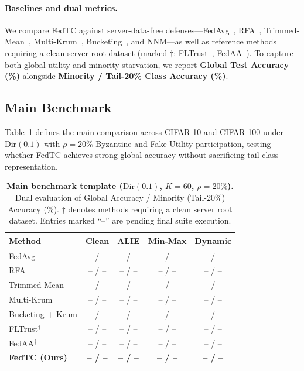 \paragraph{Baselines and dual metrics.}
We compare FedTC against server-data-free defenses---FedAvg~\cite{mcmahan2017communication}, RFA~\cite{pillutla2022robust}, Trimmed-Mean~\cite{yin2018byzantine}, Multi-Krum~\cite{blanchard2017machine}, Bucketing~\cite{karimireddy2021learning}, and NNM---as well as reference methods requiring a clean server root dataset (marked $\dagger$: FLTrust~\cite{cao2020fltrust}, FedAA~\cite{he2025fedaa}). To capture both global utility and minority starvation, we report \textbf{Global Test Accuracy (\%)} alongside \textbf{Minority / Tail-20\% Class Accuracy (\%)}.

\subsection{Main Benchmark}
\label{sec:main_benchmark}

Table~\ref{tab:main_benchmark} defines the main comparison across CIFAR-10 and CIFAR-100 under $\mathrm{Dir}(0.1)$ with $\rho = 20\%$ Byzantine and Fake Utility participation, testing whether FedTC achieves strong global accuracy without sacrificing tail-class representation.

\begin{table}[t]
  \centering
  \caption{\textbf{Main benchmark template ($\mathrm{Dir}(0.1)$, $K=60$, $\rho=20\%$).} Dual evaluation of Global Accuracy / Minority (Tail-20\%) Accuracy (\%). $\dagger$ denotes methods requiring a clean server root dataset. Entries marked ``--'' are pending final suite execution.}
  \label{tab:main_benchmark}
  \setlength{\tabcolsep}{3.5pt}
  \small
  \begin{tabular}{lcccc}
    \toprule
    \textbf{Method} & \textbf{Clean} & \textbf{ALIE} & \textbf{Min-Max} & \textbf{Dynamic} \\
    \midrule
    FedAvg & -- / -- & -- / -- & -- / -- & -- / -- \\
    RFA & -- / -- & -- / -- & -- / -- & -- / -- \\
    Trimmed-Mean & -- / -- & -- / -- & -- / -- & -- / -- \\
    Multi-Krum & -- / -- & -- / -- & -- / -- & -- / -- \\
    Bucketing + Krum & -- / -- & -- / -- & -- / -- & -- / -- \\
    \midrule
    FLTrust$^\dagger$ & -- / -- & -- / -- & -- / -- & -- / -- \\
    FedAA$^\dagger$ & -- / -- & -- / -- & -- / -- & -- / -- \\
    \midrule
    \textbf{FedTC (Ours)} & \textbf{-- / --} & \textbf{-- / --} & \textbf{-- / --} & \textbf{-- / --} \\
    \bottomrule
  \end{tabular}
\end{table}

